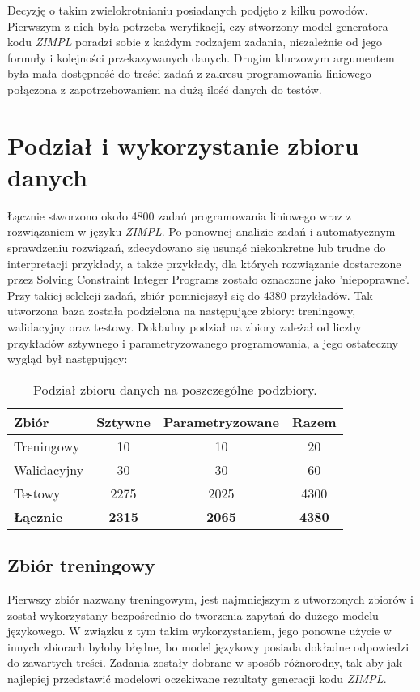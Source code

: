 Decyzję o takim zwielokrotnianiu posiadanych podjęto z kilku powodów. Pierwszym z nich była potrzeba weryfikacji, czy stworzony model generatora kodu  \textit{ZIMPL} poradzi sobie z każdym rodzajem zadania, niezależnie od jego formuły i kolejności przekazywanych danych. Drugim kluczowym argumentem była mała dostępność do treści zadań z zakresu programowania liniowego połączona z zapotrzebowaniem na dużą ilość danych do testów.

\section{Podział i wykorzystanie zbioru danych}

Łącznie stworzono około 4800 zadań programowania liniowego wraz z rozwiązaniem w języku  \textit{ZIMPL}. Po ponownej analizie zadań i automatycznym sprawdzeniu rozwiązań, zdecydowano się usunąć niekonkretne lub trudne do interpretacji przykłady, a także przykłady, dla których rozwiązanie dostarczone przez Solving Constraint Integer Programs zostało oznaczone jako 'niepoprawne'. Przy takiej selekcji zadań, zbiór pomniejszył się do 4380 przykładów. Tak utworzona baza została podzielona na następujące zbiory: treningowy, walidacyjny oraz testowy. Dokładny podział na zbiory zależał od liczby przykładów sztywnego i parametryzowanego programowania, a jego ostateczny wygląd był następujący:

\begin{table}[ht]
\caption{Podział zbioru danych na poszczególne podzbiory.}\label{tab:tabela}
\centering%
\begin{tabular}{|l|c|c|c|}
\hline
\textbf{Zbiór} & \textbf{Sztywne} & \textbf{Parametryzowane} & \textbf{Razem} \\
\hline
Treningowy & 10 & 10 & 20\\
\hline
Walidacyjny & 30 & 30 & 60\\
\hline
Testowy & 2275 & 2025 & 4300\\
\hline
\textbf{Łącznie} & \textbf{2315} & \textbf{2065} & \textbf{4380}\\
\hline
\end{tabular}
\end{table}

\subsection{Zbiór treningowy}

Pierwszy zbiór nazwany treningowym, jest najmniejszym z utworzonych zbiorów i został wykorzystany bezpośrednio do tworzenia zapytań do dużego modelu językowego. W związku z tym takim wykorzystaniem, jego ponowne użycie w innych zbiorach byłoby błędne, bo model językowy posiada dokładne odpowiedzi do zawartych treści. Zadania zostały dobrane w sposób różnorodny, tak aby jak najlepiej przedstawić modelowi oczekiwane rezultaty generacji kodu  \textit{ZIMPL}. 

